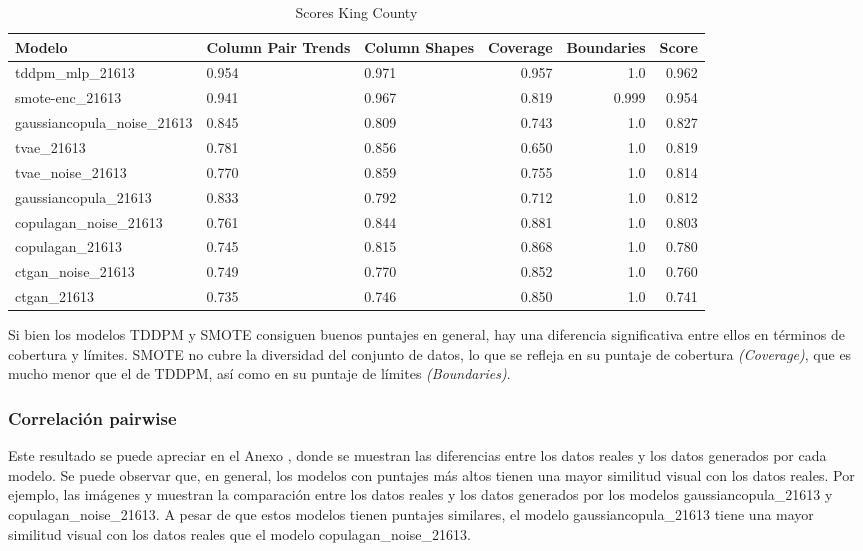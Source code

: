 \begin{table}[H]
    \centering
    \caption{Scores King County}
    \label{kingcounty-scores}
    \begin{tabular}{|l|m{5em}|m{5em}|r|r|r|}
        \hline
        \rowcolor[gray]{0.8}
        Modelo & Column Pair Trends & Column Shapes & Coverage & Boundaries & \textbf{Score} \\ \hline
        tddpm\_mlp\_21613           & 0.954 & 0.971 & 0.957 & 1.0 & 0.962 \\ \hline
        smote-enc\_21613            & 0.941 & 0.967 & 0.819 & 0.999 & 0.954 \\ \hline
        gaussiancopula\_noise\_21613& 0.845 & 0.809 & 0.743 & 1.0 & 0.827 \\ \hline
        tvae\_21613                 & 0.781 & 0.856 & 0.650 & 1.0 & 0.819 \\ \hline
        tvae\_noise\_21613          & 0.770 & 0.859 & 0.755 & 1.0 & 0.814 \\ \hline
        gaussiancopula\_21613       & 0.833 & 0.792 & 0.712 & 1.0 & 0.812 \\ \hline
        copulagan\_noise\_21613     & 0.761 & 0.844 & 0.881 & 1.0 & 0.803 \\ \hline
        copulagan\_21613            & 0.745 & 0.815 & 0.868 & 1.0 & 0.780 \\ \hline
        ctgan\_noise\_21613         & 0.749 & 0.770 & 0.852 & 1.0 & 0.760 \\ \hline
        ctgan\_21613                & 0.735 & 0.746 & 0.850 & 1.0 & 0.741 \\ \hline
    \end{tabular}
\end{table}

Si bien los modelos TDDPM y SMOTE consiguen buenos puntajes en general, hay una diferencia significativa entre ellos en términos de cobertura y límites. SMOTE no cubre la diversidad del conjunto de datos, lo que se refleja en su puntaje de cobertura \emph{(Coverage)}, que es mucho menor que el de TDDPM, así como en su puntaje de límites \emph{(Boundaries)}.
\newpage
\subsubsection{Correlación pairwise}
Este resultado se puede apreciar en el Anexo , donde se muestran las diferencias entre los datos reales y los datos generados por cada modelo. Se puede observar que, en general, los modelos con puntajes más altos tienen una mayor similitud visual con los datos reales. Por ejemplo, las imágenes  y  muestran la comparación entre los datos reales y los datos generados por los modelos gaussiancopula\_21613 y copulagan\_noise\_21613. A pesar de que estos modelos tienen puntajes similares, el modelo gaussiancopula\_21613 tiene una mayor similitud visual con los datos reales que el modelo copulagan\_noise\_21613.

